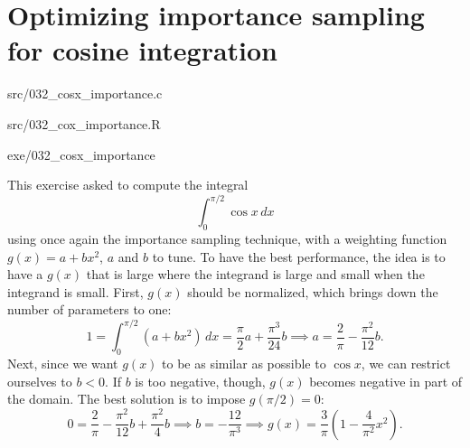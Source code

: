 \section{Optimizing importance sampling for cosine integration}\label{ex:032}

\begin{sourcefiles}
  \item[Source code] src/032\_cosx\_importance.c
  \item[Analysis script] src/032\_cox\_importance.R
  \item[Executable] exe/032\_cosx\_importance
\end{sourcefiles}

This exercise asked to compute the integral
\begin{equation}
  \int_{0}^{\pi/2} \cos x \, dx
\end{equation}
using once again the importance sampling technique, with a weighting function
$g(x) = a + bx^2$, $a$ and $b$ to tune. To have the best performance, the idea
is to have a $g(x)$ that is large where the integrand is large and small when
the integrand is small. First, $g(x)$ should be normalized, which brings down
the number of parameters to one:
\begin{equation}
  1 = \int_{0}^{\pi/2} (a + bx^{2})\, dx = \frac{\pi}{2}a + \frac{\pi^{3}}{24}b
  \implies a = \frac{2}{\pi} - \frac{\pi^{2}}{12}b.
\end{equation}
Next, since we want $g(x)$ to be as similar as possible to $\cos x$, we can
restrict ourselves to $b < 0$. If $b$ is too negative, though, $g(x)$ becomes
negative in part of the domain. The best solution is to impose $g(\pi/2) = 0$:
\begin{equation}
  0 = \frac{2}{\pi} - \frac{\pi^{2}}{12}b + \frac{\pi^{2}}{4}b \implies b =
  -\frac{12}{\pi^{3}} \implies g(x) = \frac{3}{\pi}\left(1 -
  \frac{4}{\pi^{2}}x^{2}\right).
\end{equation}

